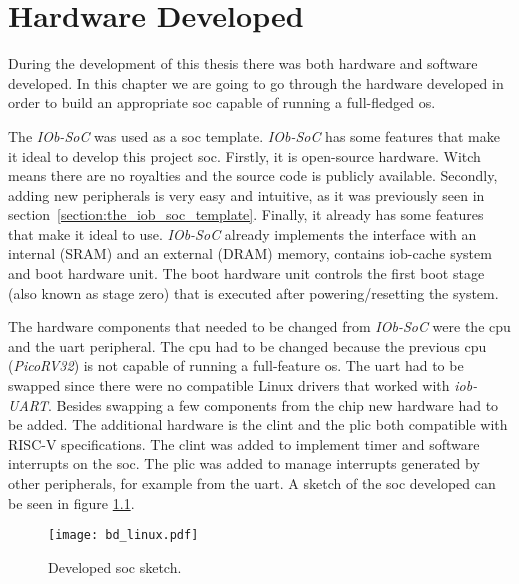 \chapter{Hardware Developed}
During the development of this thesis there was both hardware and software developed. In this chapter we are going to go through the hardware developed in order to build an appropriate \acrfull{soc} capable of running a full-fledged \acrfull{os}.

The \textit{IOb-SoC} was used as a \acrfull{soc} template. \textit{IOb-SoC} has some features that make it ideal to develop this project \acrshort{soc}. Firstly, it is open-source hardware. Witch means there are no royalties and the source code is publicly available. Secondly, adding new peripherals is very easy and intuitive, as it was previously seen in section~\ref{section:the_iob_soc_template}. Finally, it already has some features that make it ideal to use. \textit{IOb-SoC} already implements the interface with an internal (SRAM) and an external (DRAM) memory, contains iob-cache system and boot hardware unit. The boot hardware unit controls the first boot stage (also known as stage zero) that is executed after powering/resetting the system.

The hardware components that needed to be changed from \textit{IOb-SoC} were the \acrfull{cpu} and the \acrfull{uart} peripheral. The \acrshort{cpu} had to be changed because the previous \acrshort{cpu} (\textit{PicoRV32}) is not capable of running a full-feature \acrlong{os}. The \acrshort{uart} had to be swapped since there were no compatible Linux drivers that worked with \textit{iob-UART}. Besides swapping a few components from the chip new hardware had to be added. The additional hardware is the \acrshort{clint} and the \acrshort{plic} both compatible with RISC-V specifications. The \acrshort{clint} was added to implement timer and software interrupts on the \acrshort{soc}. The \acrshort{plic} was added to manage interrupts generated by other peripherals, for example from the \acrshort{uart}. A sketch of the \acrshort{soc} developed can be seen in figure \ref{fig:bd_linux}.

\begin{figure}[!h]
    \centering
    \texttt{[image: bd\_linux.pdf]}
    \caption{Developed \acrshort{soc} sketch.}
    \label{fig:bd_linux}
\end{figure}

